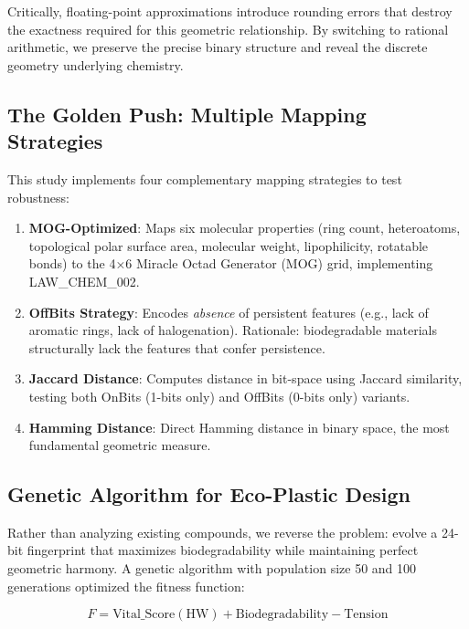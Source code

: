 \documentclass[11pt,letterpaper]{article}
\begin{document}
Critically, floating-point approximations introduce rounding errors that destroy the exactness required for this geometric relationship. By switching to rational arithmetic, we preserve the precise binary structure and reveal the discrete geometry underlying chemistry.

\subsection{The Golden Push: Multiple Mapping Strategies}

This study implements four complementary mapping strategies to test robustness:

\begin{enumerate}
    \item \textbf{MOG-Optimized}: Maps six molecular properties (ring count, heteroatoms, topological polar surface area, molecular weight, lipophilicity, rotatable bonds) to the 4×6 Miracle Octad Generator (MOG) grid, implementing LAW\_CHEM\_002.
    
    \item \textbf{OffBits Strategy}: Encodes \emph{absence} of persistent features (e.g., lack of aromatic rings, lack of halogenation). Rationale: biodegradable materials structurally lack the features that confer persistence.
    
    \item \textbf{Jaccard Distance}: Computes distance in bit-space using Jaccard similarity, testing both OnBits (1-bits only) and OffBits (0-bits only) variants.
    
    \item \textbf{Hamming Distance}: Direct Hamming distance in binary space, the most fundamental geometric measure.
\end{enumerate}

\subsection{Genetic Algorithm for Eco-Plastic Design}

Rather than analyzing existing compounds, we reverse the problem: evolve a 24-bit fingerprint that maximizes biodegradability while maintaining perfect geometric harmony. A genetic algorithm with population size 50 and 100 generations optimized the fitness function:

\begin{equation}
F = \text{Vital\_Score}(\text{HW}) + \text{Biodegradability} - \text{Tension}
\end{equation}
\end{document}
